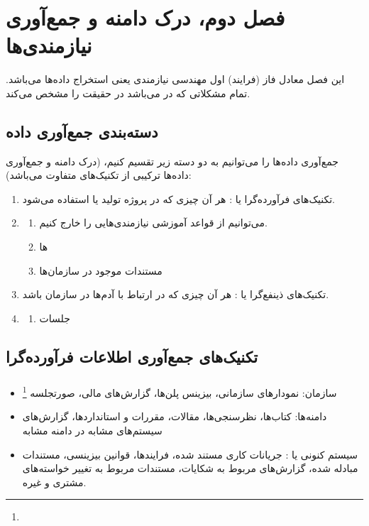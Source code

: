 \newpage
\section{فصل دوم، درک دامنه و جمع‌آوری نیازمندی‌ها}

این فصل معادل فاز (فرایند) اول مهندسی نیازمندی یعنی استخراج داده‌ها می‌باشد.
تمام مشکلاتی که در  می‌باشد در حقیقت  را مشخص می‌کند.

\subsection{دسته‌بندی جمع‌آوری داده}

جمع‌آوری داده‌ها را می‌توانیم به دو دسته زیر تقسیم کنیم، (درک دامنه و جمع‌آوری
داده‌ها ترکیبی از تکنیک‌های متفاوت می‌باشد):

\begin{enumerate}
    \item تکنیک‌های فرآورده‌گرا یا : هر آن چیزی که در پروژه
    تولید یا استفاده می‌شود.
    \item \begin{enumerate}
        \item می‌توانیم از قواعد آموزشی نیازمندی‌هایی را خارج کنیم.
        \item {}ها
        \item مستندات موجود در سازمان‌ها
    \end{enumerate}
    \item تکنیک‌های ذینفع‌گرا یا : هر آن چیزی که در
    ارتباط با آدم‌ها در سازمان باشد.
    \item \begin{enumerate}
        \item جلسات
    \end{enumerate}
\end{enumerate}

\subsection{تکنیک‌های جمع‌آوری اطلاعات فرآورده‌گرا}

\subsubsection{}

\begin{itemize}
    \item سازمان: نمودار‌های سازمانی، بیزینس پلن‌ها، گزارش‌های مالی، صورتجلسه
    \footnote{}
    \item دامنه‌ها: کتاب‌ها، نظرسنجی‌ها، مقالات، مقررات و استاندارد‌ها،
    گزارش‌های سیستم‌های مشابه در دامنه مشابه
    \item سیستم کنونی یا : جریانات کاری مستند شده، فرایند‌ها،
    قوانین بیزینسی، مستندات مبادله شده، گزارش‌های مربوط به شکایات، مستندات مربوط
    به تغییر خواسته‌های مشتری و غیره.
\end{itemize}


